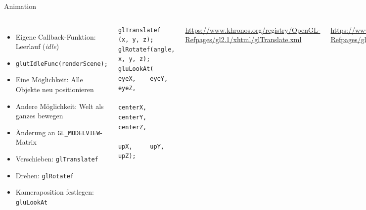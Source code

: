 \begin{frame}[fragile]{Animation}
%
\begin{columns}[T]
\begin{itemize}
\item Eigene Callback-Funktion: Leerlauf (\emph{idle})
\item \texttt{glutIdleFunc(renderScene);}
\item Eine Möglichkeit: Alle Objekte neu positionieren
\item Andere Möglichkeit: Welt als ganzes bewegen
\item[$\Rightarrow$] Änderung an \texttt{GL\_MODELVIEW}-Matrix
\item Verschieben: \texttt{glTranslatef}
\item Drehen: \texttt{glRotatef}
\item Kameraposition festlegen: \texttt{gluLookAt}
\end{itemize}
%
\begin{codebox}
\begin{verbatim}
glTranslatef    (x, y, z);
glRotatef(angle, x, y, z);
gluLookAt(   eyeX,    eyeY,    eyeZ,
          centerX, centerY, centerZ,
              upX,     upY,     upZ);
\end{verbatim}
\end{codebox}
%
{\tiny
\url{https://www.khronos.org/registry/OpenGL-Refpages/gl2.1/xhtml/glTranslate.xml}

\url{https://www.khronos.org/registry/OpenGL-Refpages/gl2.1/xhtml/glRotate.xml}

\url{https://www.khronos.org/registry/OpenGL-Refpages/gl2.1/xhtml/gluLookAt.xml}\\
}
\end{columns}

%
\end{frame}


